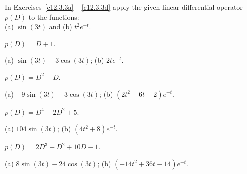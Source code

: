 \documentclass{ximera}
\begin{document}
\noindent In Exercises~\ref{c12.3.3a} -- \ref{c12.3.3d} apply the given
linear differential operator $p(D)$ to the functions: \\
(a) $\sin(3t)$ and  (b) $t^2 e^{-t}$.
\begin{exercise} \label{c12.3.3a}
$p(D) = D+1$.

\begin{solution}
\ans (a) $\sin(3t)+3\cos(3t)$; (b) $2te^{-t}$.

\end{solution}
\end{exercise}
\begin{exercise} \label{c12.3.3b}
$p(D) = D^2-D$.

\begin{solution}
\ans (a) $-9\sin(3t)-3\cos(3t)$; (b) $(2t^2-6t+2)e^{-t}$.

\end{solution}
\end{exercise}
\begin{exercise} \label{c12.3.3c}
$p(D) = D^4-2D^2+5$.

\begin{solution}
\ans (a) $104\sin(3t)$; (b) $(4t^2+8)e^{-t}$.

\end{solution}
\end{exercise}
\begin{exercise} \label{c12.3.3d}
$p(D) = 2D^3-D^2+10D-1$.

\begin{solution}
\ans (a) $8\sin(3t)-24\cos(3t)$; (b) $(-14t^2+36t-14)e^{-t}$.


\end{solution}
\end{exercise}
\end{document}
